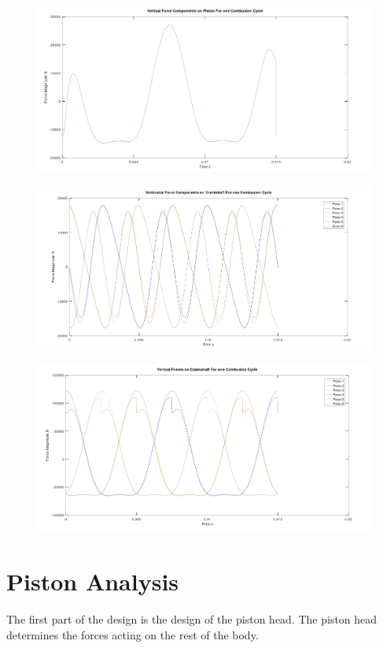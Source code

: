\documentclass[10pt,a4paper]{article}
\begin{document}
	\begin{figure}[H]
		\centering
		\includegraphics[width=\textwidth]{Selection_359.png}
	\end{figure}
	\begin{figure}[H]
		\centering
		\includegraphics[width=\textwidth]{Selection_358.png}
	\end{figure}
	\begin{figure}[H]
		\centering
		\includegraphics[width=\textwidth]{Selection_357.png}
	\end{figure}
\newpage
\section*{Piston Analysis}
The first part of the design is the design of the piston head. The piston head determines the forces acting on the rest of the body.
\end{document}

